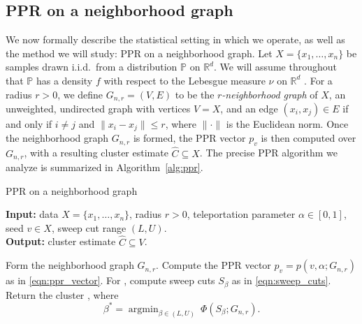 \documentclass[11pt,twoside]{article}
\theoremstyle{definition}
\newcommand{\Reals}{\mathbb{R}}
\newcommand{\1}{\mathbf{1}}
\DeclareMathOperator*{\argmin}{argmin}
\newcommand{\Rd}{\Reals^d}
\newcommand{\Pbb}{\mathbb{P}}
\newcommand{\wh}[1]{\widehat{#1}}
\begin{document}
\subsection{PPR on a neighborhood graph}
\label{subsec:ppr_neighborhood_graph}
We now formally describe the statistical setting in which we operate, as well as the method we will study: PPR on a neighborhood graph. Let $X = \{x_1,\ldots, x_n\}$ be samples drawn i.i.d.\ from a distribution
$\Pbb$ on $\Rd$. We will assume throughout that $\Pbb$ has a density $f$ with respect to the Lebesgue measure $\nu$ on $\Rd$ . For a radius $r > 0$, we define
$G_{n,r}=(V,E)$ to be the \emph{$r$-neighborhood graph} of $X$, an
unweighted, undirected graph with vertices $V=X$, and an edge $(x_i,x_j) \in
E$ if and only if $i \neq j$ and $\|x_i - x_j\| \leq r$, where $\|\cdot\|$ is the
Euclidean norm. Once the neighborhood graph $G_{n,r}$ is formed, the PPR vector $p_v$ is then computed over $G_{n,r}$, with a resulting cluster estimate $\wh{C} \subseteq X$. The precise PPR algorithm we analyze is summarized in Algorithm~\ref{alg:ppr}.   

\begin{algorithm}
	\caption{PPR on a neighborhood graph}
	\label{alg:ppr}	
	{\bfseries Input:} data $X=\{x_1,\ldots,x_n\}$, radius $r > 0$, teleportation
	parameter $\alpha \in [0,1]$, seed $v \in X$, sweep cut range $(L,U)$. \\     
	{\bfseries Output:} cluster estimate $\wh{C} \subseteq V$.
	\begin{algorithmic}[1]
		\STATE Form the neighborhood graph $G_{n,r}$.
		\STATE Compute the PPR vector $p_v=p(v, \alpha; G_{n,r})$ as in
		\eqref{eqn:ppr_vector}.  
		\STATE For , compute sweep cuts $S_{\beta}$ as in
		\eqref{eqn:sweep_cuts}.\footnotemark
		\STATE Return the cluster \smash{$\wh{C} = S_{\beta^*}$}, where  
		$$
		\beta^* = \argmin_{\beta \in (L,U)}~ \Phi(S_{\beta}; G_{n,r}).
		$$
	\end{algorithmic}
\end{algorithm}
\end{document}
